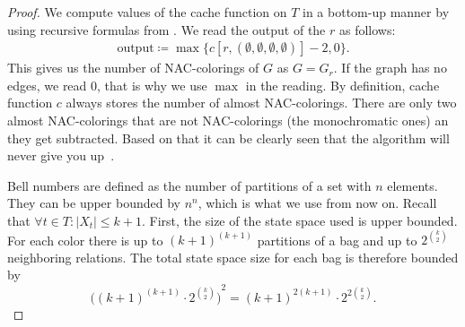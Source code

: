 %
%
\begin{proof}
	We compute values of the cache function on \( T \) in a bottom-up manner
	by using recursive formulas from
	.
	We read the output of the \RootNode{} \( r \) as follows:
	\begin{align*}
		\text{output} \coloneqq \max\{c[r, (\emptyset,\emptyset,\emptyset,\emptyset)] - 2, 0\}.
	\end{align*}
	This gives us the number of NAC-colorings of \( G \) as \( G = G_r \).
	If the graph has no edges, we read \( 0 \), that is why we use \( \max{} \) in the reading.
	By definition, cache function \( c \) always stores the number of almost NAC-colorings.
	There are only two almost NAC-colorings
	that are not NAC-colorings (the monochromatic ones) an they get subtracted.
	Based on that it can be clearly seen that the algorithm
	will never give you up~\cite{never_gonna_give_you_up}.

	Bell numbers are defined as
	the number of partitions of a set with \( n \) elements.
	They can be upper bounded by \( n^n \), which is what we use from now on.
	Recall that \( \forall t \in T : |X_t| \le k+1 \).
	First, the size of the state space used is upper bounded.
	For each color there is up to \( {(k+1)}^{(k+1)} \) partitions of a bag and
	up to \( 2^{\binom{k}{2}} \) neighboring relations.
	The total state space size for each bag is therefore bounded by
	\[ {\Big({(k+1)}^{(k+1)} \cdot 2^{\binom{k}{2}} \Big)}^2 = {(k+1)}^{2(k+1)} \cdot 2^{2 \binom{k}{2}}. \]


\end{proof}
